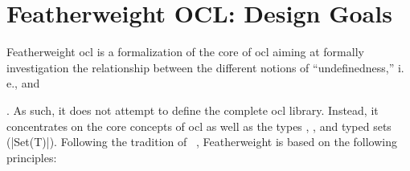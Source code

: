 \documentclass[11pt,a4paper,openright,twoside,abstracton]{scrreprt}
\newcommand{\ie}{i.\,e.\xspace}
\begin{document}


\section{Featherweight OCL: Design Goals}
Featherweight \acs{ocl} is a formalization of the core of \acs{ocl}
aiming at formally investigation the relationship between the
different notions of ``undefinedness,'' \ie,  and

. As such, it does not attempt to define the complete
\acs{ocl} library. Instead, it concentrates on the core concepts of
\acs{ocl} as well as the types ,
, and typed sets (\inlineocl|Set(T)|).  Following
the tradition of
\holocl~\cite{brucker.ea:hol-ocl:2008,brucker.ea:hol-ocl-book:2006},
Featherweight \OCL is based on the following principles:
\end{document}
